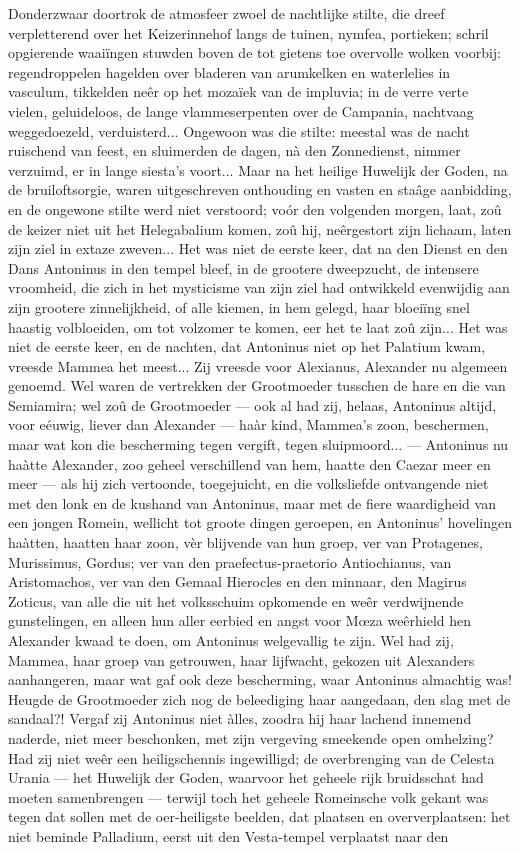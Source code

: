 \documentclass[a4paper, 12pt, oneside, dutch]{article}
\begin{document}
Donderzwaar doortrok de atmosfeer zwoel de nachtlijke stilte, die dreef verpletterend over het Keizerinnehof langs de tuinen, nymfea, portieken; schril opgierende waaiïngen stuwden boven de tot gietens toe overvolle wolken voorbij: regendroppelen hagelden over bladeren van arumkelken en waterlelies in vasculum, tikkelden neêr op het mozaïek van de impluvia; in de verre verte vielen, geluideloos, de lange vlammeserpenten over de Campania, nachtvaag weggedoezeld, verduisterd... Ongewoon was die stilte: meestal was de nacht ruischend van feest, en sluimerden de dagen, nà den Zonnedienst, nimmer verzuimd, er in lange siesta's voort... Maar na het heilige Huwelijk der Goden, na de bruiloftsorgie, waren uitgeschreven onthouding en vasten en staâge aanbidding, en de ongewone stilte werd niet verstoord; voór den volgenden morgen, laat, zoû de keizer niet uit het Helegabalium komen, zoû hij, neêrgestort zijn lichaam, laten zijn ziel in extaze zweven... Het was niet de eerste keer, dat na den Dienst en den Dans Antoninus in den tempel bleef, in de grootere dweepzucht, de intensere vroomheid, die zich in het mysticisme van zijn ziel had ontwikkeld evenwijdig aan zijn grootere zinnelijkheid, of alle kiemen, in hem gelegd, haar bloeiïng snel haastig volbloeiden, om tot volzomer te komen, eer het te laat zoû zijn... Het was niet de eerste keer, en de nachten, dat Antoninus niet op het Palatium kwam, vreesde Mammea het meest... Zij vreesde voor Alexianus, Alexander nu algemeen genoemd. Wel waren de vertrekken der Grootmoeder tusschen de hare en die van Semiamira; wel zoû de Grootmoeder --- ook al had zij, helaas, Antoninus altijd, voor eéuwig, liever dan Alexander --- haàr kind, Mammea's zoon, beschermen, maar wat kon die bescherming tegen vergift, tegen sluipmoord... --- Antoninus nu haàtte Alexander, zoo geheel verschillend van hem, haatte den Caezar meer en meer --- als hij zich vertoonde, toegejuicht, en die volksliefde ontvangende niet met den lonk en de kushand van Antoninus, maar met de fiere waardigheid van een jongen Romein, wellicht tot groote dingen geroepen, en Antoninus' hovelingen haàtten, haatten haar zoon, vèr blijvende van hun groep, ver van Protagenes, Murissimus, Gordus; ver van den praefectus-praetorio Antiochianus, van Aristomachos, ver van den Gemaal Hierocles en den minnaar, den Magirus Zoticus, van alle die uit het volksschuim opkomende en weêr verdwijnende gunstelingen, en alleen hun aller eerbied en angst voor Mœza weêrhield hen Alexander kwaad te doen, om Antoninus welgevallig te zijn. Wel had zij, Mammea, haar groep van getrouwen, haar lijfwacht, gekozen uit Alexanders aanhangeren, maar wat gaf ook deze bescherming, waar Antoninus almachtig was! Heugde de Grootmoeder zich nog de beleediging haar aangedaan, den slag met de sandaal?! Vergaf zij Antoninus niet àlles, zoodra hij haar lachend innemend naderde, niet meer beschonken, met zijn vergeving smeekende open omhelzing? Had zij niet weêr een heiligschennis ingewilligd; de overbrenging van de Celesta Urania --- het Huwelijk der Goden, waarvoor het geheele rijk bruidsschat had moeten samenbrengen --- terwijl toch het geheele Romeinsche volk gekant was tegen dat sollen met de oer-heiligste beelden, dat plaatsen en oververplaatsen: het niet beminde Palladium, eerst uit den Vesta-tempel verplaatst naar den 
\end{document}
